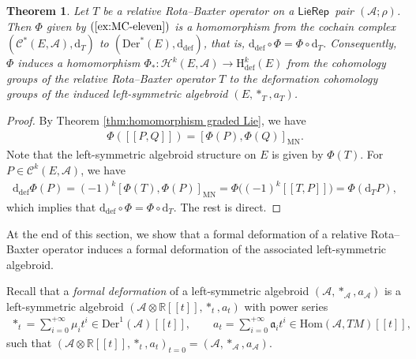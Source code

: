 \documentclass[10pt,a4paper]{amsart}
\numberwithin{equation}{section}
\newtheorem{thm}{Theorem}[section]
\newcommand{\Real}{\mathbb R}
\newcommand{\huaA}{\mathcal{A}}
\newcommand{\huaC}{\mathcal{C}}
\newcommand{\huaH}{\mathcal{H}}
\newcommand{\frka}{\mathfrak a}
\newcommand{\Courant}[1]{\left[\!\left[ #1\right]\!\right]}
\newcommand{\dM}{\mathrm{d}}
\newcommand{\Hom}{\mathrm{Hom}}
\newcommand{\Der}{\mathrm{Der}}
\newcommand{\Hi}{\mathrm{H}}
\newcommand{\MN}{\mathrm{MN}}
\newcommand{\Def}{\mathrm{def}}
\newcommand{\LP}{$\mathsf{LieRep}$~}
\begin{document}
\begin{thm}%
Let $T$ be a relative Rota--Baxter operator on a \LP pair $(\huaA;\rho)$. Then $\Phi$ given by $(\ref{ex:MC-eleven})$ is a homomorphism from the cochain complex $(\huaC^*(E,\huaA),\dM_{T})$ to $(\Der^*(E),\dM_{\Def})$, that is, $\dM_{\Def}\circ\Phi=\Phi\circ \dM_{T}$. Consequently, $\Phi$ induces a homomorphism $\Phi_{*}\colon \huaH^k(E,\huaA)\rightarrow \Hi_{\Def}^{k}(E)$ from the cohomology groups of the relative Rota--Baxter operator $T$ to the deformation cohomology groups of the induced left-symmetric algebroid $(E, \ast_{T}, a_T)$.
\end{thm}

\begin{proof}
By Theorem \ref{thm:homomorphism graded Lie}, we have
\begin{gather*}
\Phi(\Courant{P,Q})=[\Phi(P),\Phi(Q)]_\MN.
\end{gather*}
Note that the left-symmetric algebroid structure on $E$ is given by $\Phi(T)$. For $P\in\huaC^{k}(E,\huaA)$, we have
\begin{eqnarray*}
 \dM_{\Def}\Phi(P)=(-1)^k[\Phi(T),\Phi(P)]_{\MN}=\Phi\big((-1)^k\Courant{T,P}\big)=\Phi(\dM_T P),
\end{eqnarray*}
which implies that $\dM_{\Def}\circ\Phi=\Phi\circ \dM_{T}$. The rest is direct.
\end{proof}

At the end of this section, we show that a formal deformation of a relative Rota--Baxter operator induces a formal deformation of the associated left-symmetric algebroid.

Recall that a {\it formal deformation} of a left-symmetric algebroid $(\huaA,\ast_{\huaA},a_{\huaA})$ is a left-symmetric algebroid $(\huaA\otimes \Real[[t]],\ast_t,a_t)$ with power series
\begin{gather*}
 \ast_t =\sum_{i=0}^{+\infty}\mu_it^i\in \Der^1(\huaA)[[t]],\qquad
 a_t=\sum_{i=0}^{+\infty}\frka_i t^i \in \Hom(\huaA,TM)[[t]],
\end{gather*}
such that $(\huaA\otimes \Real[[t]],\ast_t,a_t)_{t=0}=(\huaA,\ast_{\huaA},a_{\huaA})$.
\end{document}
